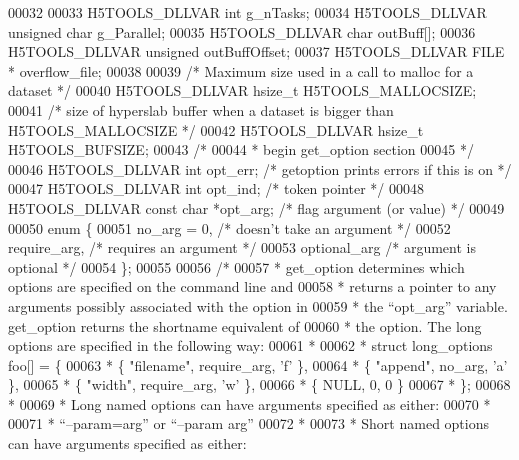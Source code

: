 \begin{DoxyCode}
00032 
00033 H5TOOLS\_DLLVAR \textcolor{keywordtype}{int}  g\_nTasks;
00034 H5TOOLS\_DLLVAR \textcolor{keywordtype}{unsigned} \textcolor{keywordtype}{char} g\_Parallel;
00035 H5TOOLS\_DLLVAR \textcolor{keywordtype}{char}    outBuff[];
00036 H5TOOLS\_DLLVAR \textcolor{keywordtype}{unsigned} outBuffOffset;
00037 H5TOOLS\_DLLVAR FILE *   overflow\_file;
00038 
00039 \textcolor{comment}{/* Maximum size used in a call to malloc for a dataset */}
00040 H5TOOLS\_DLLVAR hsize\_t H5TOOLS\_MALLOCSIZE;
00041 \textcolor{comment}{/* size of hyperslab buffer when a dataset is bigger than H5TOOLS\_MALLOCSIZE */}
00042 H5TOOLS\_DLLVAR hsize\_t H5TOOLS\_BUFSIZE;
00043 \textcolor{comment}{/*}
00044 \textcolor{comment}{ * begin get\_option section}
00045 \textcolor{comment}{ */}
00046 H5TOOLS\_DLLVAR \textcolor{keywordtype}{int}         opt\_err;     \textcolor{comment}{/* getoption prints errors if this is on    */}
00047 H5TOOLS\_DLLVAR \textcolor{keywordtype}{int}         opt\_ind;     \textcolor{comment}{/* token pointer                            */}
00048 H5TOOLS\_DLLVAR \textcolor{keyword}{const} \textcolor{keywordtype}{char} *opt\_arg;     \textcolor{comment}{/* flag argument (or value)                 */}
00049 
00050 \textcolor{keyword}{enum} \{
00051     no\_arg = 0,         \textcolor{comment}{/* doesn't take an argument     */}
00052     require\_arg,        \textcolor{comment}{/* requires an argument          */}
00053     optional\_arg        \textcolor{comment}{/* argument is optional         */}
00054 \};
00055 
00056 \textcolor{comment}{/*}
00057 \textcolor{comment}{ * get\_option determines which options are specified on the command line and}
00058 \textcolor{comment}{ * returns a pointer to any arguments possibly associated with the option in}
00059 \textcolor{comment}{ * the ``opt\_arg'' variable. get\_option returns the shortname equivalent of}
00060 \textcolor{comment}{ * the option. The long options are specified in the following way:}
00061 \textcolor{comment}{ *}
00062 \textcolor{comment}{ * struct long\_options foo[] = \{}
00063 \textcolor{comment}{ *   \{ "filename", require\_arg, 'f' \},}
00064 \textcolor{comment}{ *   \{ "append", no\_arg, 'a' \},}
00065 \textcolor{comment}{ *   \{ "width", require\_arg, 'w' \},}
00066 \textcolor{comment}{ *   \{ NULL, 0, 0 \}}
00067 \textcolor{comment}{ * \};}
00068 \textcolor{comment}{ *}
00069 \textcolor{comment}{ * Long named options can have arguments specified as either:}
00070 \textcolor{comment}{ *}
00071 \textcolor{comment}{ *   ``--param=arg'' or ``--param arg''}
00072 \textcolor{comment}{ *}
00073 \textcolor{comment}{ * Short named options can have arguments specified as either:}

\end{DoxyCode}
